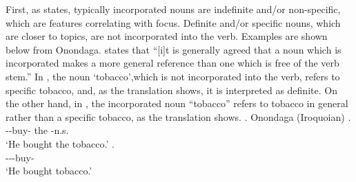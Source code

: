 First,
as  states,
typically incorporated nouns are {indefinite} and/or {non-specific},
which are features correlating with focus.
Definite and/or specific nouns, which are closer to topics,
are not incorporated into the verb.
Examples are shown below from Onondaga.
 states that
``[i]t is generally agreed that a noun which is incorporated makes a more general reference than one which is free of the verb stem.''
In \Next[a], the noun `tobacco',which is not incorporated into the verb,
refers to specific tobacco, and, as the translation shows,
it is interpreted as definite.
On the other hand, in \Next[b],
the incorporated noun ``tobacco'' refers to tobacco in general rather than a specific tobacco, as the translation shows.
%
\ex. Onondaga (Iroquoian)
 \ag.    \\
       --buy- the -n.s. \\
       `He bought the tobacco.'
 \bg.  \\
      ---buy- \\
      `He bought tobacco.'
      \hfill{\cite[10]{woodbury75a}}

